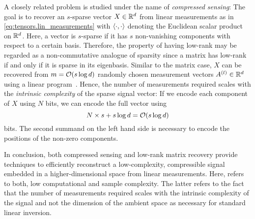 A closely related problem is studied under the name of \emph{compressed sensing}:
The goal is to recover an $s$-sparse vector $X \in {\mathbb{R}}^d$ from linear measurements as in \cref{eq:tensors.lin_measurements} with $\braket{\cdot, \cdot}$ denoting the Euclidean scalar product on ${\mathbb{R}}^d$.
Here, a vector is $s$-sparse if it has $s$ non-vanishing components with respect to a certain basis.
Therefore, the property of having low-rank may be regarded as a non-commutative analogue of sparsity since a matrix has low-rank if and only if it is sparse in its eigenbasis.
Similar to the matrix case, $X$ can be recovered from $m = {\mathcal{O}}(s \log d)$ randomly chosen measurement vectors $A^{(l)} \in {\mathbb{R}}^d$ using a linear program~\cite{Rauhut}.
Hence, the number of measurements required scales with the \emph{intrinsic complexity} of the sparse signal vector:
If we encode each component of $X$ using $N$ bits, we can encode the full vector using
\[
  N \times s + s \log d = {\mathcal{O}}(s \log d)
\]
bits.
The second summand on the left hand side is necessary to encode the positions of the non-zero components.

In conclusion, both compressed sensing and low-rank matrix recovery provide techniques to efficiently reconstruct a low-complexity, compressible signal embedded in a higher-dimensional space from linear measurements.
Here,  refers to both, low computational and sample complexity.
The latter refers to the fact that the number of measurements required scales with the intrinsic complexity of the signal and not the dimension of the ambient space as necessary for standard linear inversion.\\



